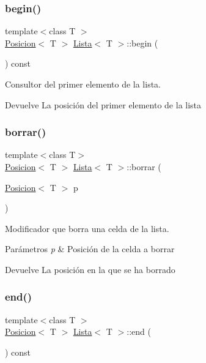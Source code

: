 \subsubsection{\texorpdfstring{begin()}{begin()}}
{\footnotesize\ttfamily template$<$class T $>$ \\
\mbox{\hyperlink{classPosicion}{Posicion}}$<$ T $>$ \mbox{\hyperlink{classLista}{Lista}}$<$ T $>$\+::begin (\begin{DoxyParamCaption}{ }\end{DoxyParamCaption}) const}



Consultor del primer elemento de la lista. 

\begin{DoxyReturn}{Devuelve}
La posición del primer elemento de la lista 
\end{DoxyReturn}
\mbox{\label{classLista_a65536b824c9cd33570fab5a98ad536fb}} 
\subsubsection{\texorpdfstring{borrar()}{borrar()}}
{\footnotesize\ttfamily template$<$class T$>$ \\
\mbox{\hyperlink{classPosicion}{Posicion}}$<$ T $>$ \mbox{\hyperlink{classLista}{Lista}}$<$ T $>$\+::borrar (\begin{DoxyParamCaption}\item[{\mbox{\hyperlink{classPosicion}{Posicion}}$<$ T $>$}]{p }\end{DoxyParamCaption})}



Modificador que borra una celda de la lista. 


\begin{DoxyParams}{Parámetros}
{\em p} & Posición de la celda a borrar \\
\hline
\end{DoxyParams}
\begin{DoxyReturn}{Devuelve}
La posición en la que se ha borrado 
\end{DoxyReturn}
\mbox{\label{classLista_ae88b437349a0e87803d4453946e21f97}} 
\subsubsection{\texorpdfstring{end()}{end()}}
{\footnotesize\ttfamily template$<$class T $>$ \\
\mbox{\hyperlink{classPosicion}{Posicion}}$<$ T $>$ \mbox{\hyperlink{classLista}{Lista}}$<$ T $>$\+::end (\begin{DoxyParamCaption}{ }\end{DoxyParamCaption}) const}



